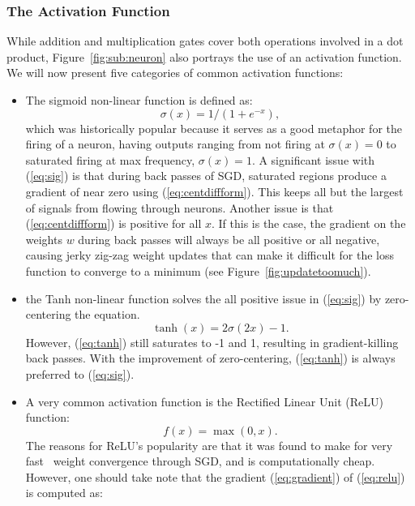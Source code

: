 \subsubsection{The Activation Function}
While addition and multiplication gates cover both operations involved in a dot product, Figure~\ref{fig:sub:neuron} also portrays the use of an activation function. We will now present five categories of common activation functions:
\begin{itemize}
\item The sigmoid non-linear function is defined as:
\begin{equation}
\label{eq:sig}
\sigma(x) = 1 / (1 + e^{-x}),
\end{equation}
which was historically popular because it serves as a good metaphor for the firing of a neuron, having outputs ranging from not firing at $\sigma(x)=0$ to saturated firing at max frequency, $\sigma(x)=1$. A significant issue with (\ref{eq:sig}) is that during back passes of SGD, saturated regions produce a gradient of near zero using (\ref{eq:centdiffform}). This keeps all but the largest of signals from flowing through neurons. Another issue is that (\ref{eq:centdiffform}) is positive for all $x$. If this is the case, the gradient on the weights $w$ during back passes will always be all positive or all negative, causing jerky zig-zag weight updates that can make it difficult for the loss function to converge to a minimum (see Figure~\ref{fig:updatetoomuch}).

\item the Tanh non-linear function solves the all positive issue in (\ref{eq:sig}) by zero-centering the equation.
\begin{equation}
\label{eq:tanh}
\tanh(x) = 2 \sigma(2x) -1.
\end{equation}
However, (\ref{eq:tanh}) still saturates to -1 and 1, resulting in gradient-killing back passes. With the improvement of zero-centering, (\ref{eq:tanh}) is always preferred to (\ref{eq:sig}).

\item A very common activation function is the Rectified Linear Unit (ReLU) function:
\begin{equation}
\label{eq:relu}
f(x) = \max(0, x).
\end{equation}
The reasons for ReLU's popularity are that it was found to make for very fast~\cite{Krizhevsky:2012:ICD:2999134.2999257} weight convergence through SGD, and is computationally cheap. However, one should take note that the gradient (\ref{eq:gradient}) of (\ref{eq:relu}) is computed as:


\end{itemize}
